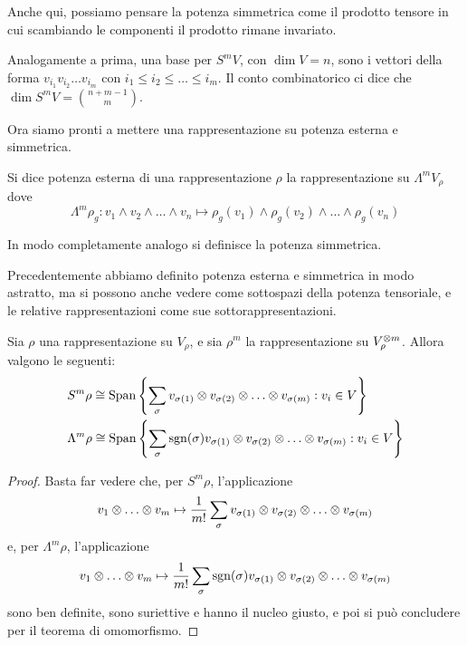 Anche qui, possiamo pensare la potenza simmetrica come il prodotto tensore in cui scambiando le componenti il prodotto rimane invariato.

Analogamente a prima, una base per $S^mV$, con $\dim V=n$, sono i vettori della forma  $v_{i_1}v_{i_2}\dots v_{i_m}$ con $i_1\le i_2\le \dots \le i_m$. Il conto combinatorico ci dice che $\dim S^mV = \binom{n+m-1}m$.

Ora siamo pronti a mettere una rappresentazione su potenza esterna e simmetrica.



\begin{mydef}
  Si dice potenza esterna di una rappresentazione $\rho$ la rappresentazione su $\Lambda^m V_\rho$ dove
  \[
  \Lambda^m\rho_g: v_1 \wedge v_2 \wedge \dots \wedge v_n \mapsto \rho_g(v_1) \wedge \rho_g(v_2) \wedge \dots \wedge \rho_g(v_n)
  \]
  
  In modo completamente analogo si definisce la potenza simmetrica.

\end{mydef}

Precedentemente abbiamo definito potenza esterna e simmetrica in modo astratto, ma si possono anche vedere come sottospazi della potenza tensoriale, e le relative rappresentazioni come sue sottorappresentazioni.

\begin{myprop}
  Sia $\rho$ una rappresentazione su $V_\rho$, e sia $\rho^m$ la rappresentazione su $V_\rho^{\otimes m}$. Allora valgono le seguenti: 
  \begin{eqnarray*}
  &S^m\rho \isom \Span{\left\{\sum_\sigma v_{\sigma(1)}\tensor v_{\sigma(2)} \tensor \dots \tensor v_{\sigma(m)}:v_i \in V\right\}}\\
  &\Lambda^m\rho \isom \Span{\left\{\sum_\sigma \sgn(\sigma) v_{\sigma(1)}\tensor v_{\sigma(2)} \tensor \dots \tensor v_{\sigma(m)}:v_i \in V\right\}} 
  \end{eqnarray*}

\end{myprop}

\begin{proof}
  Basta far vedere che, per $S^m\rho$, l'applicazione
  \[
  v_1 \tensor \dots \tensor v_m \mapsto \frac1{m!} \sum_\sigma v_{\sigma(1)}\tensor v_{\sigma(2)} \tensor \dots \tensor v_{\sigma(m)}
  \]
  e, per $\Lambda^m\rho$, l'applicazione
  \[
  v_1 \tensor \dots \tensor v_m \mapsto \frac1{m!} \sum_\sigma \sgn(\sigma) v_{\sigma(1)}\tensor v_{\sigma(2)} \tensor \dots \tensor v_{\sigma(m)}
  \] sono ben definite, sono suriettive e hanno il nucleo giusto, e poi si può concludere per il teorema di omomorfismo. 
\end{proof}

